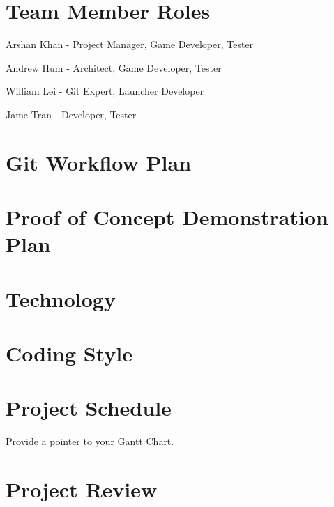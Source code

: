 \documentclass{article}
\begin{document}
\section{Team Member Roles}

\item Arshan Khan - Project Manager, Game Developer, Tester
\item Andrew Hum - Architect, Game Developer, Tester
\item William Lei - Git Expert, Launcher Developer
\item Jame Tran - Developer, Tester

\section{Git Workflow Plan}



\section{Proof of Concept Demonstration Plan}

\section{Technology}

\section{Coding Style}

\section{Project Schedule}

Provide a pointer to your Gantt Chart.

\section{Project Review}
\end{document}
